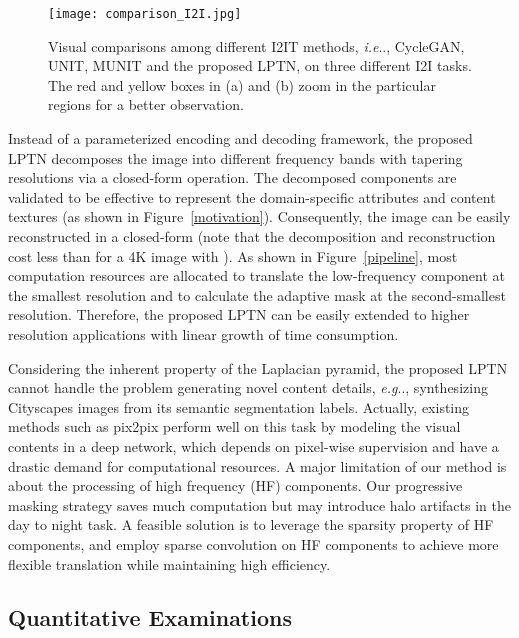 \documentclass[10pt,twocolumn,letterpaper]{article}
\makeatletter
\DeclareRobustCommand\onedot{\futurelet\@let@token\@onedot}
\def\@onedot{\ifx\@let@token.\else.\null\fi\xspace}
\def\eg{\emph{e.g}\onedot} \def\Eg{\emph{E.g}\onedot}
\def\ie{\emph{i.e}\onedot} \def\Ie{\emph{I.e}\onedot}
\makeatother
\begin{document}
	\begin{figure*}[t]
		\centering
		\texttt{[image: comparison\_I2I.jpg]}
		\caption{Visual comparisons among different I2IT methods, \ie, CycleGAN, UNIT, MUNIT and the proposed LPTN, on three different I2I tasks. The red and yellow boxes in (a) and (b) zoom in the particular regions for a better observation.
			\label{comparison_I2I}}
	\end{figure*}
	
	
	Instead of a parameterized encoding and decoding framework, the proposed LPTN decomposes the image into different frequency bands with tapering resolutions via a closed-form operation. The decomposed components are validated to be effective to represent the domain-specific attributes and content textures (as shown in Figure~\ref{motivation}). Consequently, the image can be easily reconstructed in a closed-form (note that the decomposition and reconstruction cost less than  for a 4K image with ). As shown in Figure~\ref{pipeline}, most computation resources are allocated to translate the low-frequency component at the smallest resolution and to calculate the adaptive mask at the second-smallest resolution. Therefore, the proposed LPTN can be easily extended to higher resolution applications with linear growth of time consumption.
	
	Considering the inherent property of the Laplacian pyramid, the proposed LPTN cannot handle the problem generating novel content details, \eg, synthesizing Cityscapes images from its semantic segmentation labels. Actually, existing methods such as pix2pix perform well on this task by modeling the visual contents in a deep network, which depends on pixel-wise supervision and have a drastic demand for computational resources. A major limitation of our method is about the processing of high frequency (HF) components. Our progressive masking strategy saves much computation but may introduce halo artifacts in the day to night task. A feasible solution is to leverage the sparsity property of HF components, and employ sparse convolution on HF components to achieve more flexible translation while maintaining high efficiency.
	
	\subsection{Quantitative Examinations}
	\label{quantitative_comp}
	
\end{document}
